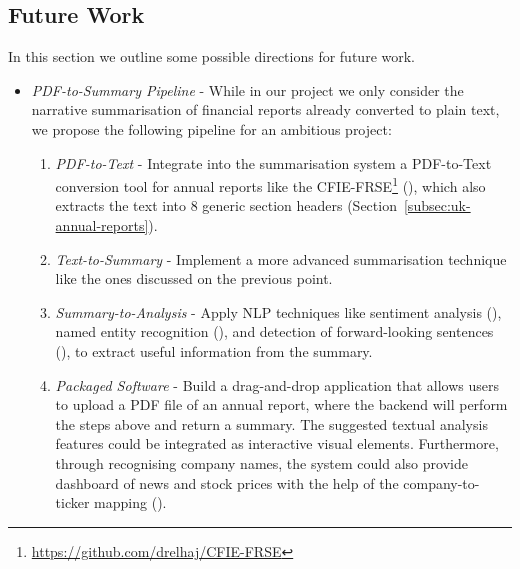 \subsection{Future Work}\label{subsec:future-work}
In this section we outline some possible directions for future work.
\begin{itemize}
    \item \emph{PDF-to-Summary Pipeline} - While in our project we only consider the narrative summarisation of
    financial reports already converted to plain text, we propose the following pipeline for an ambitious project:
    \begin{enumerate}
        \item \emph{PDF-to-Text} - Integrate into the summarisation system a PDF-to-Text conversion tool for annual
        reports like the CFIE-FRSE\footnote{\url{https://github.com/drelhaj/CFIE-FRSE}} (\cite{elhaj2019multilingual}), which
        also extracts the text into 8 generic section headers (Section~\ref{subsec:uk-annual-reports}).
        \item \emph{Text-to-Summary} - Implement a more advanced summarisation technique like the ones discussed on the previous point.
        \item \emph{Summary-to-Analysis} - Apply NLP techniques like sentiment analysis (\cite{araci2019finbert}), named entity recognition
        (\cite{zhang2022finbertmrc}), and detection of forward-looking sentences (\cite{stihec-etal-2021-preliminary}),
        to extract useful information from the summary.
        \item \emph{Packaged Software} - Build a drag-and-drop application that allows users to upload a PDF file of an
        annual report, where the backend will perform the steps above and return a summary.
        The suggested textual analysis features could be integrated as interactive visual elements.
        Furthermore, through recognising company names, the system could also provide dashboard of news and stock prices
        with the help of the company-to-ticker mapping (\cite{}).
    \end{enumerate}
\end{itemize}